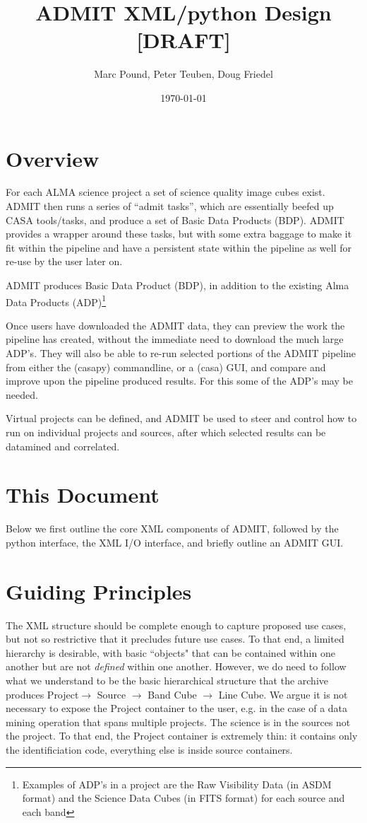 \documentclass{article}
\title{ADMIT XML/python Design [DRAFT]}
\author{Marc Pound, Peter Teuben, Doug Friedel}
\date{\today}
\begin{document}
\maketitle

\section{Overview}

For each ALMA science project a set of science quality image cubes
exist. ADMIT then runs a series of ``admit tasks'', which are
essentially beefed up CASA tools/tasks, and produce a set of Basic
Data Products (BDP).  ADMIT provides a wrapper around these tasks, but
with some extra baggage to make it fit within the pipeline and have a
persistent state within the pipeline as well for re-use by the user
later on.

ADMIT produces Basic Data Product (BDP), in addition to the existing
Alma Data Products (ADP)\footnote{Examples of ADP's in a project are
the Raw Visibility Data (in ASDM format) and the Science Data Cubes
(in FITS format) for each source and each band}

Once users have downloaded the ADMIT data, they can preview the work
the pipeline has created, without the immediate need to download the
much large ADP's. They will also be able to re-run selected portions
of the ADMIT pipeline from either the (casapy) commandline, or a
(casa) GUI, and compare and improve upon the pipeline produced
results. For this some of the ADP's may be needed.

Virtual projects can be defined, and ADMIT be used to steer and control
how to run on individual projects and sources, after which selected
results can be datamined and correlated.

\section{This Document}

Below we first outline the core XML components of ADMIT, followed by
the python interface, the XML I/O interface, and briefly outline an
ADMIT GUI.

\section{Guiding Principles}

The XML structure should be complete enough to capture proposed use cases,
but not so restrictive that it precludes future use cases. To that end, a
limited hierarchy is desirable, with basic ``objects" that can be contained
within one another but are not {\it defined} within one another.  However, we
do need to follow what we understand to be the basic hierarchical structure
that the archive produces 
Project$\rightarrow$ Source $\rightarrow$ Band Cube $\rightarrow$ Line Cube.
We argue it is not necessary to expose the Project container to
the user, e.g. in the case of a data mining operation that spans multiple
projects. The science is in the sources not the project. To that end, the
Project container is extremely thin: it contains only the identificiation
code, everything else is inside source containers.
\end{document}
